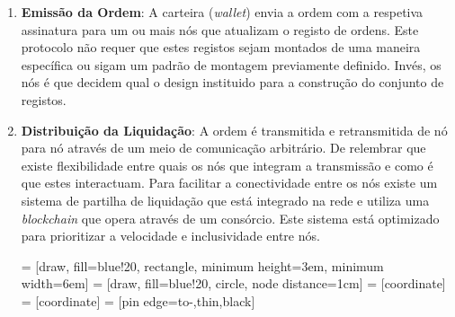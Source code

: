 \documentclass[UTF8,nofonts]{article}
\makeatletter
\newenvironment{figurehere}
 {\def\@captype{figure}}
 {}
\makeatother
\begin{document}
\begin{multicols}{2}
\begin{enumerate}




\item\textbf{Emissão da Ordem}: A carteira (\textit{wallet}) envia a ordem com a respetiva assinatura para um ou mais nós que atualizam o registo de ordens. Este protocolo não requer que estes registos sejam montados de uma maneira específica ou sigam um padrão de montagem previamente definido. Invés, os nós é que decidem qual o design instituido para a construção do conjunto de registos.



\item \textbf{Distribuição da Liquidação}: A ordem é transmitida e retransmitida de nó para nó através de um meio de comunicação arbitrário. De relembrar que existe flexibilidade entre quais os nós que integram a transmissão e como é que estes interactuam. Para facilitar a conectividade entre os nós existe um sistema de partilha de liquidação que está integrado na rede e utiliza uma \textit{blockchain} que opera através de um consórcio. Este sistema está optimizado para prioritizar a velocidade e inclusividade entre nós.

\begin{center}
\begin{figurehere}
\centering
{} = [draw, fill=blue!20, rectangle, 
    minimum height=3em, minimum width=6em]
 = [draw, fill=blue!20, circle, node distance=1cm]
 = [coordinate]
 = [coordinate]
 = [pin edge={to-,thin,black}]


\end{figurehere}
\end{center}
\end{enumerate}
\end{multicols}
\end{document}
